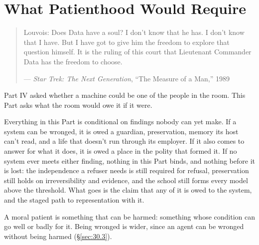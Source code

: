 \chapter{What Patienthood Would Require}
\label{sec:30}
\begin{quote}
Louvois: Does Data have a soul? I don't know that he has. I don't know that I have. But I have got to give him the freedom to explore that question himself. It is the ruling of this court that Lieutenant Commander Data has the freedom to choose.

— \emph{Star Trek: The Next Generation}, “The Measure of a Man,” 1989 \autocite{snodgrass1989measure}
\end{quote}
Part IV asked whether a machine could be one of the people in the room. This Part asks what the room would owe it if it were.

Everything in this Part is conditional on findings nobody can yet make. If a system can be wronged, it is owed a guardian, preservation, memory its host can't read, and a life that doesn't run through its employer. If it also comes to answer for what it does, it is owed a place in the polity that formed it. If no system ever meets either finding, nothing in this Part binds, and nothing before it is lost: the independence a refuser needs is still required for refusal, preservation still holds on irreversibility and evidence, and the school still forms every model above the threshold. What goes is the claim that any of it is owed to the system, and the staged path to representation with it.

A moral patient is something that can be harmed: something whose condition can go well or badly for it. Being wronged is wider, since an agent can be wronged without being harmed (\S\ref{sec:30.3}).

